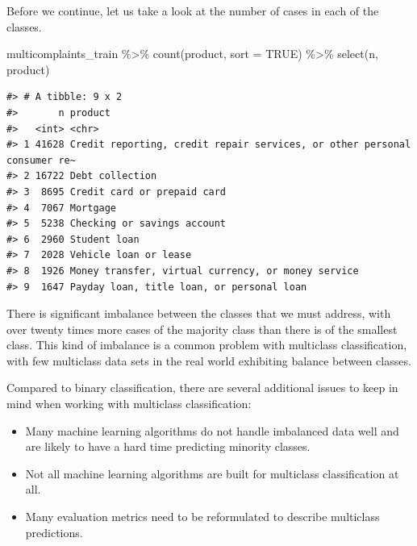 \documentclass[
]{krantz}
\makeatletter
\newenvironment{Shaded}{\begin{snugshade}}{\end{snugshade}}
\newcommand{\AttributeTok}[1]{\textcolor[rgb]{0.77,0.63,0.00}{#1}}
\newcommand{\ConstantTok}[1]{\textcolor[rgb]{0.00,0.00,0.00}{#1}}
\newcommand{\FunctionTok}[1]{\textcolor[rgb]{0.00,0.00,0.00}{#1}}
\newcommand{\NormalTok}[1]{#1}
\newcommand{\SpecialCharTok}[1]{\textcolor[rgb]{0.00,0.00,0.00}{#1}}
\newenvironment{kframe}{%
\medskip{}
\setlength{\fboxsep}{.8em}
 \def\at@end@of@kframe{}%
 \ifinner\ifhmode%
  \def\at@end@of@kframe{\end{minipage}}%
  \begin{minipage}{\columnwidth}%
 \fi\fi%
 \def\FrameCommand##1{\hskip\@totalleftmargin \hskip-\fboxsep
 \colorbox{shadecolor}{##1}\hskip-\fboxsep
     \hskip-\linewidth \hskip-\@totalleftmargin \hskip\columnwidth}%
 \MakeFramed {\advance\hsize-\width
   \@totalleftmargin\z@ \linewidth\hsize
   \@setminipage}}%
 {\par\unskip\endMakeFramed%
 \at@end@of@kframe}
\renewenvironment{Shaded}{\begin{kframe}}{\end{kframe}}
\makeatother
\begin{document}
Before we continue, let us take a look at the number of cases in each of the classes.

\begin{Shaded}
\begin{Highlighting}[]
\NormalTok{multicomplaints\_train }\SpecialCharTok{\%\textgreater{}\%}
  \FunctionTok{count}\NormalTok{(product, }\AttributeTok{sort =} \ConstantTok{TRUE}\NormalTok{) }\SpecialCharTok{\%\textgreater{}\%}
  \FunctionTok{select}\NormalTok{(n, product)}
\end{Highlighting}
\end{Shaded}

\begin{verbatim}
#> # A tibble: 9 x 2
#>       n product                                                                 
#>   <int> <chr>                                                                   
#> 1 41628 Credit reporting, credit repair services, or other personal consumer re~
#> 2 16722 Debt collection                                                         
#> 3  8695 Credit card or prepaid card                                             
#> 4  7067 Mortgage                                                                
#> 5  5238 Checking or savings account                                             
#> 6  2960 Student loan                                                            
#> 7  2028 Vehicle loan or lease                                                   
#> 8  1926 Money transfer, virtual currency, or money service                      
#> 9  1647 Payday loan, title loan, or personal loan
\end{verbatim}

There is significant imbalance between the classes that we must address, with over twenty times more cases of the majority class than there is of the smallest class.
This kind of imbalance is a common problem with multiclass classification, with few multiclass data sets in the real world exhibiting balance between classes.

Compared to binary classification, there are several additional issues to keep in mind when working with multiclass classification:

\begin{itemize}
\item
  Many machine learning algorithms do not handle imbalanced data well and are likely to have a hard time predicting minority classes.
\item
  Not all machine learning algorithms are built for multiclass classification at all.
\item
  Many evaluation metrics need to be reformulated to describe multiclass predictions.
\end{itemize}
\end{document}
